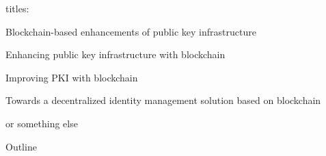 \documentclass[11pt]{beamer}
\begin{document}
\begin{frame}
titles:

Blockchain-based enhancements of public key infrastructure

Enhancing public key infrastructure with blockchain

Improving PKI with blockchain

Towards a decentralized identity management solution based on blockchain

or something else
\end{frame}

\begin{frame}{Outline}
\tableofcontents
\end{frame}








\end{document}
